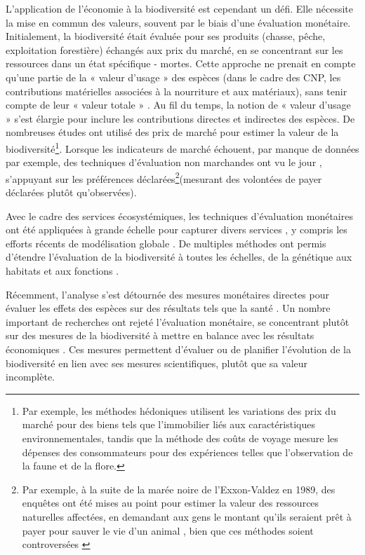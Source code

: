 L'application de l'économie à la biodiversité est cependant un défi. Elle nécessite la mise en commun des valeurs, souvent par le biais d'une évaluation monétaire. Initialement, la biodiversité était évaluée pour ses produits (chasse, pêche, exploitation forestière) échangés aux prix du marché, en se concentrant sur les ressources dans un état spécifique - mortes. Cette approche ne prenait en compte qu'une partie de la « valeur d'usage » des espèces (dans le cadre des CNP, les contributions matérielles associées à la nourriture et aux matériaux), sans tenir compte de leur « valeur totale » \citep{Krutilla1967}. Au fil du temps, la notion de « valeur d'usage » s'est élargie pour inclure les contributions directes et indirectes des espèces.  De nombreuses études ont utilisé des prix de marché pour estimer la valeur de la biodiversité\footnote{ Par exemple, les méthodes hédoniques \citep{rosen_hedonic_1974} utilisent les variations des prix du marché pour des biens tels que l'immobilier liés aux caractéristiques environnementales, tandis que la méthode des coûts de voyage \citep{clawson_economics_1967, bhandari_willingness_2010} mesure les dépenses des consommateurs pour des expériences telles que l'observation de la faune et de la flore.}. Lorsque les indicateurs de marché échouent, par manque de données par exemple, des techniques d'évaluation non marchandes ont vu le jour \citep{carson_contingent_2012}, s'appuyant sur les préférences déclarées\footnote{Par exemple, à la suite de la marée noire de l'Exxon-Valdez en 1989, des enquêtes ont été mises au point pour estimer la valeur des ressources naturelles affectées, en demandant aux gens le montant qu'ils seraient prêt à payer pour sauver le vie d'un animal \citep{carson_contingent_1992, arrow_report_1993, carson_contingent_2003}, bien que ces méthodes soient controversées \citep{Diamond94}}(mesurant des volontées de payer déclarées plutôt qu'observées). 

Avec le cadre des services écosystémiques, les techniques d'évaluation monétaires ont été appliquées à grande échelle pour capturer divers services \citep{Costanza1997}, y compris les efforts récents de modélisation globale \citep{giglio_economics_2024}. De multiples méthodes ont permis d'étendre l'évaluation de la biodiversité à toutes les échelles, de la génétique aux habitats et aux fonctions \citep{bartkowski_capturing_2015}.

Récemment, l'analyse s'est détournée des mesures monétaires directes pour évaluer les effets des espèces sur des résultats tels que la santé \citep{frank_social_nodate,frank_economic_2024}. Un nombre important de recherches ont rejeté l'évaluation monétaire, se concentrant plutôt sur des mesures de la biodiversité à mettre en balance avec les résultats économiques \citep{Mouysset2011, Watzold2016a}.  Ces mesures permettent d'évaluer ou de planifier l'évolution de la biodiversité en lien avec ses mesures scientifiques, plutôt que sa valeur incomplète. 

